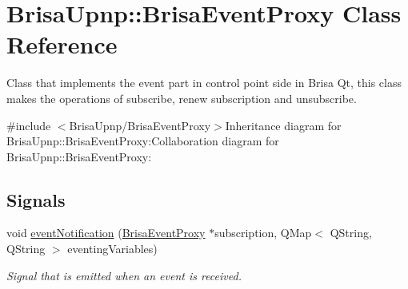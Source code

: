 \hypertarget{classBrisaUpnp_1_1BrisaEventProxy}{
\section{BrisaUpnp::BrisaEventProxy Class Reference}
\label{classBrisaUpnp_1_1BrisaEventProxy}
}


Class that implements the event part in control point side in Brisa Qt, this class makes the operations of subscribe, renew subscription and unsubscribe.  


{\ttfamily \#include $<$BrisaUpnp/BrisaEventProxy$>$}Inheritance diagram for BrisaUpnp::BrisaEventProxy:Collaboration diagram for BrisaUpnp::BrisaEventProxy:\subsection*{Signals}
\begin{DoxyCompactItemize}
\item 
void \hyperlink{classBrisaUpnp_1_1BrisaEventProxy_a3b25868182d81b6ac7a8d703c5777b42}{eventNotification} (\hyperlink{classBrisaUpnp_1_1BrisaEventProxy}{BrisaEventProxy} $\ast$subscription, QMap$<$ QString, QString $>$ eventingVariables)
\begin{DoxyCompactList}\small\item\em Signal that is emitted when an event is received. \item\end{DoxyCompactList}\end{DoxyCompactItemize}
